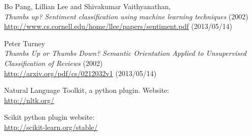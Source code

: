 \documentclass[a4paper,12pt]{report}
\begin{document}
\begin{thebibliography}{9}


  
  Bo Pang, Lillian Lee and Shivakumar Vaithyanathan,\\
  \emph{Thumbs up? Sentiment classification using machine learning techniques} (2002)\\
  \url{http://www.cs.cornell.edu/home/llee/papers/sentiment.pdf} (2013/05/14)

  Peter Turney\\
  \emph{Thumbs Up or Thumbs Down? Semantic Orientation Applied to Unsupervised Classification of Reviews} (2002)\\
  \url{http://arxiv.org/pdf/cs/0212032v1} (2013/05/14)
  
  Natural Language Toolkit, a python plugin. Website:\\
  \url{http://nltk.org/}
  
  Scikit python plugin website:\\
  \url{http://scikit-learn.org/stable/}

\end{thebibliography}
\end{document}
